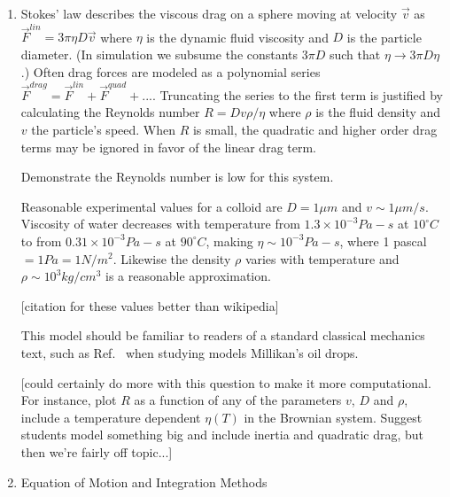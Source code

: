 \documentclass[twocolumn,preprintnumbers,amsmath,amssymb,aps,prx]{revtex4}
\begin{document}
\begin{enumerate}
\item Stokes' law describes the viscous drag on a sphere
  moving at velocity $\vec{v}$ as 
  $\vec{F}^{lin} = 3 \pi \eta D \vec{v}$ \cite{}
  where $\eta$ is the dynamic fluid viscosity and 
  $D$ is the particle diameter.
  (In simulation we
  subsume the constants $3 \pi D$
  such that $\eta \rightarrow 3 \pi D \eta$.)
  Often drag forces are
  modeled as a polynomial series
  $\vec{F}^{drag} = \vec{F}^{lin} + \vec{F}^{quad} + ... $.
  Truncating the series to the first term
  is justified by calculating the Reynolds number  
  $R = D v \rho / \eta$
  where $\rho$ is the fluid density and $v$ the particle's speed.
  When $R$ is small, the quadratic and higher order drag terms
  may be ignored in favor of the linear drag term.

  Demonstrate the Reynolds number is low
  for this system.
  
  Reasonable experimental values for
  a colloid are $D = 1 \mu m$ and $v \sim 1 \mu m /s$.
  Viscosity of water decreases with temperature
  from $1.3 \times 10^{-3} Pa-s$ at $10^{\circ}C$ to 
  from $0.31 \times 10^{-3} Pa-s$ at $90^{\circ}C$,
  making $\eta \sim 10^{-3} Pa-s$,
  where 1 pascal $ = 1 Pa = 1 N/m^2$.
  Likewise the density $\rho$ varies with temperature
  and $\rho \sim 10^3 kg/cm^3$ is a reasonable approximation.
  
  [citation for these values better than wikipedia] \cite{} %

This model should be familiar to readers
of a standard classical mechanics text, such as Ref.~\cite{Taylor2005}
when studying 
models Millikan's oil drops.

[could certainly do more with this question to make it more computational.  For instance, plot $R$ as a function of any of the parameters $v$, $D$ and $\rho$, include a temperature dependent $\eta(T)$ in the Brownian system.  Suggest students model something big and include inertia and quadratic drag, but then we're fairly off topic...]

\label{ex:reynolds}

\item{Equation of Motion and Integration Methods}


\end{enumerate}
\end{document}
